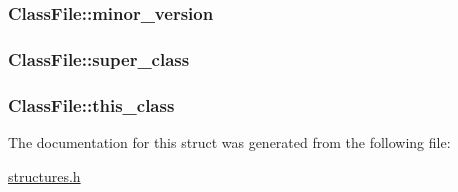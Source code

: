 \subsubsection[{\texorpdfstring{minor\+\_\+version}{minor_version}}]{ Class\+File\+::minor\+\_\+version}\hypertarget{structClassFile_af0db7b0ea01cb9cea2cee177ca81df09}{}\label{structClassFile_af0db7b0ea01cb9cea2cee177ca81df09}
\subsubsection[{\texorpdfstring{super\+\_\+class}{super_class}}]{ Class\+File\+::super\+\_\+class}\hypertarget{structClassFile_a5f6c11c0ccb02fd992b5c102725253ec}{}\label{structClassFile_a5f6c11c0ccb02fd992b5c102725253ec}
\subsubsection[{\texorpdfstring{this\+\_\+class}{this_class}}]{ Class\+File\+::this\+\_\+class}\hypertarget{structClassFile_a2d33db0a560a71b94bc572dd1e4ec03a}{}\label{structClassFile_a2d33db0a560a71b94bc572dd1e4ec03a}


The documentation for this struct was generated from the following file\+:\begin{DoxyCompactItemize}
\item 
\hyperlink{structures_8h}{structures.\+h}\end{DoxyCompactItemize}
